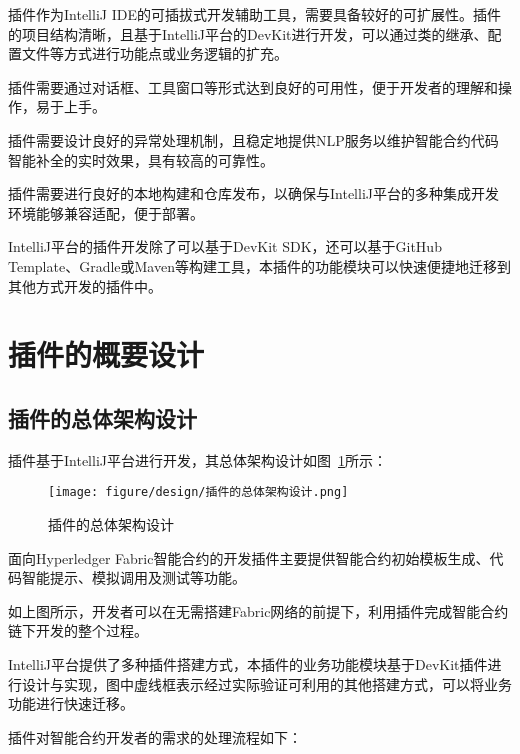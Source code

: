 插件作为IntelliJ IDE的可插拔式开发辅助工具，需要具备较好的可扩展性。插件的项目结构清晰，且基于IntelliJ平台的DevKit进行开发，可以通过类的继承、配置文件等方式进行功能点或业务逻辑的扩充。

插件需要通过对话框、工具窗口等形式达到良好的可用性，便于开发者的理解和操作，易于上手。

插件需要设计良好的异常处理机制，且稳定地提供NLP服务以维护智能合约代码智能补全的实时效果，具有较高的可靠性。

插件需要进行良好的本地构建和仓库发布，以确保与IntelliJ平台的多种集成开发环境能够兼容适配，便于部署。

IntelliJ平台的插件开发除了可以基于DevKit SDK，还可以基于GitHub Template、Gradle或Maven等构建工具，本插件的功能模块可以快速便捷地迁移到其他方式开发的插件中。

\section{插件的概要设计}

\subsection{插件的总体架构设计}

插件基于IntelliJ平台进行开发，其总体架构设计如图~\ref{fig:3.3}所示：

\begin{figure}[htb]
  \centering
  \texttt{[image: figure/design/插件的总体架构设计.png]}
  \caption{插件的总体架构设计}\label{fig:3.3}
\end{figure}

面向Hyperledger Fabric智能合约的开发插件主要提供智能合约初始模板生成、代码智能提示、模拟调用及测试等功能。

如上图所示，开发者可以在无需搭建Fabric网络的前提下，利用插件完成智能合约链下开发的整个过程。

IntelliJ平台提供了多种插件搭建方式，本插件的业务功能模块基于DevKit插件进行设计与实现，图中虚线框表示经过实际验证可利用的其他搭建方式，可以将业务功能进行快速迁移。

插件对智能合约开发者的需求的处理流程如下：

